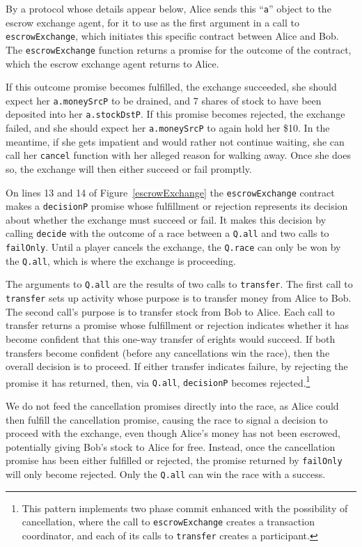 \documentclass{llncs}
\begin{document}
By a protocol whose details appear below, Alice sends this ``{\tt a}'' object to the escrow exchange agent, for it to use as the first argument in a call to {\tt escrowExchange}, which initiates this specific contract between Alice and Bob. The {\tt escrowExchange} function returns a promise for the outcome of the contract, which the escrow exchange agent returns to Alice. 

If this outcome promise becomes fulfilled, the exchange succeeded,  she should expect her {\tt a.moneySrcP} to be drained, and 7 shares of stock to have been deposited into her {\tt a.stockDstP}. If this promise becomes rejected, the exchange failed, and she should expect her {\tt a.moneySrcP} to again hold her \$10. In the meantime, if she gets impatient and would rather not continue waiting, she can call her {\tt cancel} function with her alleged reason for walking away. Once she does so, the exchange will then either succeed or fail promptly.

On lines 13 and 14 of Figure~\ref{escrowExchange} the {\tt escrowExchange} contract makes a {\tt decisionP} promise whose fulfillment or rejection represents its decision about whether the exchange must succeed or fail. It makes this decision by calling {\tt decide} with the outcome of a race between a {\tt Q.all} and two calls to {\tt failOnly}. Until a player cancels the exchange, the {\tt Q.race} can only be won by the {\tt Q.all}, which is where the exchange is proceeding.

The arguments to {\tt Q.all} are the results of two calls to {\tt transfer}. The first call to {\tt transfer} sets up activity whose purpose is to transfer money from Alice to Bob. The second call's purpose is to transfer stock from Bob to Alice. Each call to transfer returns a promise whose fulfillment or rejection indicates whether it has become confident that this one-way transfer of erights would succeed. If both transfers become confident (before any cancellations win the race), then the overall decision is to proceed. If either transfer indicates failure, by rejecting the promise it has returned, then, via {\tt Q.all}, {\tt decisionP} becomes rejected.\footnote{
%
This pattern implements two phase commit enhanced with the possibility of cancellation, where the call to {\tt escrowExchange} creates a transaction coordinator, and each of its calls to {\tt transfer} creates a participant.}

We do not feed the cancellation promises directly into the race, as Alice could then fulfill the cancellation promise, causing the race to signal a decision to proceed with the exchange, even though Alice's money has not been escrowed, potentially giving Bob's stock to Alice for free. Instead, once the cancellation promise has been either fulfilled or rejected, the promise returned by {\tt failOnly} will only become rejected. Only the {\tt Q.all} can win the race with a success.
\end{document}
